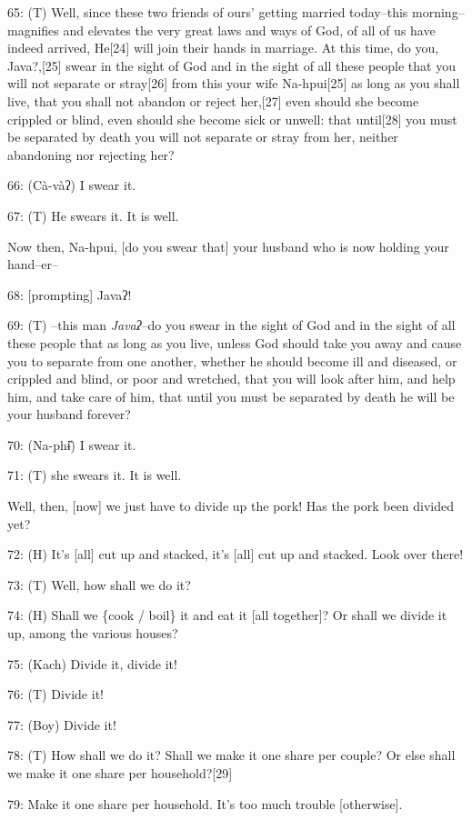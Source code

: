 \leftskip=0pt
65: (T) Well, since these two friends of ours' getting married today--this morning--magnifies
and elevates the very great laws and ways of God, of all of us have indeed arrived,
He[24] will join their hands in marriage. At this time, do you, Java?,[25] swear
in the sight of God and in the sight of all these people that you will not separate
or stray[26] from this your wife Na-hpui[25] as long as you shall live, that you
shall not abandon or reject her,[27] even should she become crippled or blind,
even should she become sick or unwell: that until[28] you must be separated by
death you will not separate or stray from her, neither abandoning nor rejecting
her?

66: (Cà-vàʔ) I swear it.

67: (T) He swears it. It is well.

Now then, Na-hpui, [do you swear that] your husband who is now holding your hand--er--

68: [prompting] Javaʔ!

69: (T) --this man \textit{Javaʔ}--do you swear in the sight of God and in the
sight of all these people that as long as you live, unless God should take you
away and cause you to separate from one another, whether he should become ill and
diseased, or crippled and blind, or poor and wretched, that you will look after
him, and help him, and take care of him, that until you must be separated by death
he will be your husband forever?

70: (Na-phɨ̂) I swear it.

71: (T) she swears it. It is well.

Well, then, [now] we just have to divide up the pork! Has the pork been divided
yet?

72: (H) It's [all] cut up and stacked, it's [all] cut up and stacked. Look over
there!

73: (T) Well, how shall we do it?

74: (H) Shall we \{cook / boil\} it and eat it [all together]? Or shall we divide
it up, among the various houses?

75: (Kach) Divide it, divide it!

76: (T) Divide it!

77: (Boy) Divide it!

78: (T) How shall we do it? Shall we make it one share per couple? Or else shall
we make it one share per household?[29]

79: Make it one share per household. It's too much trouble [otherwise].

